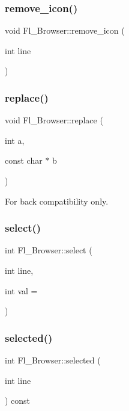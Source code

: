 \subsubsection{\texorpdfstring{remove\+\_\+icon()}{remove\_icon()}}
{\footnotesize\ttfamily void Fl\+\_\+\+Browser\+::remove\+\_\+icon (\begin{DoxyParamCaption}\item[{int}]{line }\end{DoxyParamCaption})}

\mbox{\label{class_fl___browser_aedeec78b5054172ffcd79340c0d8f184}} 
\subsubsection{\texorpdfstring{replace()}{replace()}}
{\footnotesize\ttfamily void Fl\+\_\+\+Browser\+::replace (\begin{DoxyParamCaption}\item[{int}]{a,  }\item[{const char $\ast$}]{b }\end{DoxyParamCaption})\hspace{0.3cm}{\ttfamily [inline]}}

For back compatibility only. \mbox{\label{class_fl___browser_aeeb8ee901d16becf815c258505fc3ceb}} 
\subsubsection{\texorpdfstring{select()}{select()}}
{\footnotesize\ttfamily int Fl\+\_\+\+Browser\+::select (\begin{DoxyParamCaption}\item[{int}]{line,  }\item[{int}]{val = {} }\end{DoxyParamCaption})}

\mbox{\label{class_fl___browser_aca66dd0e41251d25abefbcff1602194d}} 
\subsubsection{\texorpdfstring{selected()}{selected()}}
{\footnotesize\ttfamily int Fl\+\_\+\+Browser\+::selected (\begin{DoxyParamCaption}\item[{int}]{line }\end{DoxyParamCaption}) const}

